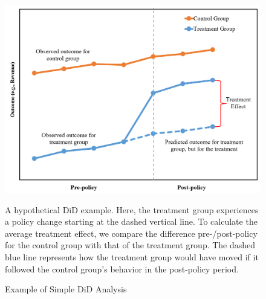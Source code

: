 \documentclass[12pt]{article}
\begin{document}
\begin{figure}[H]
    \centering
    \caption{Example of Simple DiD Analysis}
    \includegraphics[width=5in]{Figures/Diff in Diff Diagram.PNG}
    \label{fig:did-diagram}
    \vspace{5mm}
    \footnotesize \begin{singlespace*}
        \parbox{5.5in}{A hypothetical DiD example. Here, the treatment group experiences a policy change starting at the dashed vertical line. To calculate the average treatment effect, we compare the difference pre-/post-policy for the control group with that of the treatment group. The dashed blue line represents how the treatment group would have moved if it followed the control group’s behavior in the post-policy period.}
    \end{singlespace*}
\end{figure}
\noindent
\end{document}
